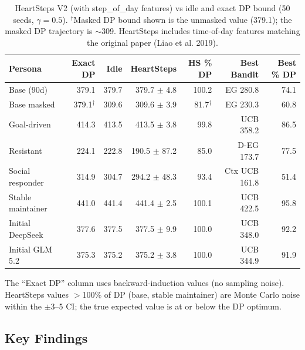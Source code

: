 \documentclass[11pt]{article}
\begin{document}
\begin{table}[h]
\centering
\small
\begin{tabular}{lrrrrrr}
\toprule
Persona & Exact DP & Idle & HeartSteps & HS \% DP & Best Bandit & Best \% DP \\
\midrule
Base (90d) & 379.1 & 379.7 & 379.7 $\pm$ 4.8 & 100.2 & EG 280.8 & 74.1 \\
Base masked & 379.1$^\dagger$ & 309.6 & 309.6 $\pm$ 3.9 & 81.7$^\dagger$ & EG 230.3 & 60.8 \\
Goal-driven & 414.3 & 413.5 & 413.5 $\pm$ 3.8 & 99.8 & UCB 358.2 & 86.5 \\
Resistant & 224.1 & 222.8 & 190.5 $\pm$ 87.2 & 85.0 & D-EG 173.7 & 77.5 \\
Social responder & 314.9 & 304.7 & 294.2 $\pm$ 48.3 & 93.4 & Ctx UCB 161.8 & 51.4 \\
Stable maintainer & 441.0 & 441.4 & 441.4 $\pm$ 2.5 & 100.1 & UCB 422.5 & 95.8 \\
Initial DeepSeek & 377.6 & 377.5 & 377.5 $\pm$ 9.9 & 100.0 & UCB 348.0 & 92.2 \\
Initial GLM 5.2 & 375.3 & 375.2 & 375.2 $\pm$ 3.8 & 100.0 & UCB 344.9 & 91.9 \\
\bottomrule
\end{tabular}
\caption{HeartSteps V2 (with step\_of\_day features) vs idle and exact DP bound (50 seeds, $\gamma = 0.5$). $^\dagger$Masked DP bound shown is the unmasked value (379.1); the masked DP trajectory is $\sim$309. HeartSteps includes time-of-day features matching the original paper (Liao et al. 2019).}
\label{tab:heartsteps}
\end{table}

The ``Exact DP'' column uses backward-induction values (no sampling noise). HeartSteps values $>$100\% of DP (base, stable maintainer) are Monte Carlo noise within the $\pm$3--5 CI; the true expected value is at or below the DP optimum.

\subsection{Key Findings}
\end{document}
